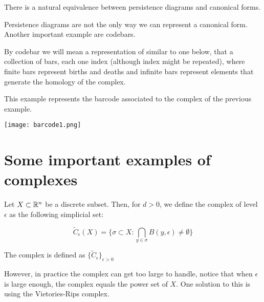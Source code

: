 \begin{proposition}[Canonical form = Persistence diagrams]

There is a natural equivalence between persistence diagrams and canonical forms.

\end{proposition}


Persistence diagrams are not the only way we can represent a canonical form. 
Another important example are codebars.

\begin{definition}
[Codebars]

By codebar we will mean a representation of similar to one below,
that a collection of bars, each one index (although index might be repeated),
where finite bars represent births and deaths and infinite bars represent elements that generate the homology of the complex.
\end{definition}

\begin{example}
This example represents the barcode
associated to the complex of the previous example.
\end{example}

\begin{center}
\texttt{[image: barcode1.png]}
\end{center}


\section{Some important examples of complexes}

\begin{definition}

Let $X\subset \mathbb{R}^n$ be a discrete subset. Then, for $d>0$, we define the \Cech
complex of level $\epsilon$ as the following simplicial set:


$$
\tilde{C}_\epsilon(X)
=
\{
\sigma \subset X :
\bigcap_{y\in\sigma} B(y,\epsilon)\neq \emptyset
\}
$$

The {\Cech} complex is defined as $\{\tilde{C}_\epsilon\}_{\epsilon>0}$

\end{definition}

However, in practice the {\Cech} complex can get too large to handle, notice that when $\epsilon$ is large enough,
the {\Cech} complex equals the power set of $X$. One solution to this is using the 
Vietories-Rips complex.

